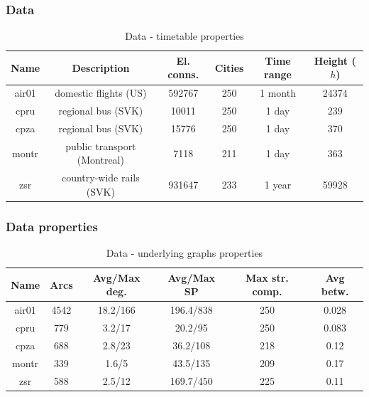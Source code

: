 \documentclass[]{beamer}
\begin{document}
        \begin{frame}
            \frametitle{Data}
			\begin{table}{
                \scriptsize
                \begin{tabular}{c|c|c|c|c|c}
                    \hline
                    \rowcolor{tablehead}
                    \textbf{Name} & \textbf{Description} & \textbf{El. conns.} & \textbf{Cities} & \textbf{Time range} & \textbf{Height ($h$)} \\
					\hline
					air01 & domestic flights (US) & 592767 & 250 & 1 month & 24374 \\
					cpru & regional bus (SVK) & 10011 & 250 & 1 day & 239 \\
					cpza & regional bus (SVK) & 15776 & 250 & 1 day & 370 \\
					montr & public transport (Montreal) & 7118 & 211 & 1 day & 363 \\
					zsr & country-wide rails (SVK) & 931647 & 233 & 1 year & 59928 \\
				\end{tabular}}
				\caption{Data - timetable properties}
            	\normalsize
			\end{table}
        \end{frame}

        \begin{frame}
            \frametitle{Data properties}
			\begin{table}{
                \scriptsize
                \begin{tabular}{c|c|c|c|c|c}
                    \hline
                    \rowcolor{tablehead}
                    \textbf{Name} & \textbf{Arcs} & \textbf{Avg/Max deg.} & \textbf{Avg/Max SP} & \textbf{Max str. comp.} & \textbf{Avg betw.} \\
					\hline
					air01 & 4542 & 18.2/166 & 196.4/838 & 250 & 0.028 \\
					cpru & 779 & 3.2/17 & 20.2/95 & 250 & 0.083 \\
					cpza & 688 & 2.8/23 & 36.2/108 & 218 & 0.12 \\
					montr & 339 & 1.6/5 & 43.5/135 & 209 & 0.17 \\
					zsr & 588 & 2.5/12 & 169.7/450 & 225 & 0.11 \\
				\end{tabular}}
				\caption{Data - underlying graphs properties}
            	\normalsize
			\end{table}
        \end{frame}
                
\end{document}
